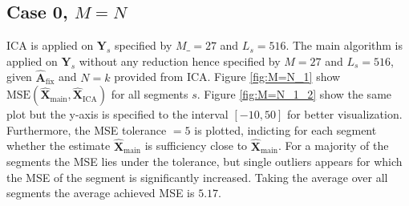 \subsection{Case 0, $M = N$}
ICA is applied on $\mathbf{Y}_s$ specified by $M\_ = 27$ and $L_s = 516$. 
The main algorithm is applied on $\mathbf{Y}_s$ without any reduction hence specified by $M = 27$ and $L_s = 516$, given $\hat{\mathbf{A}}_{\text{fix}}$ and $N = k$ provided from ICA.
Figure \ref{fig:M=N_1} show $\text{MSE}\left(\hat{\mathbf{X}}_{\text{main}},\hat{\mathbf{X}}_{\text{ICA}}\right)$ for all segments $s$. 
Figure \ref{fig:M=N_1_2} show the same plot but the y-axis is specified to the interval $[-10,50]$ for better visualization.
Furthermore, the MSE tolerance $= 5$ is plotted, indicting for each segment whether the estimate $\hat{\mathbf{X}}_{\text{main}}$ is sufficiency close to $\hat{\mathbf{X}}_{\text{main}}$. 
For a majority of the segments the MSE lies under the tolerance, but single outliers appears for which the MSE of the segment is significantly increased. Taking the average over all segments the average achieved MSE is $5.17$.    
